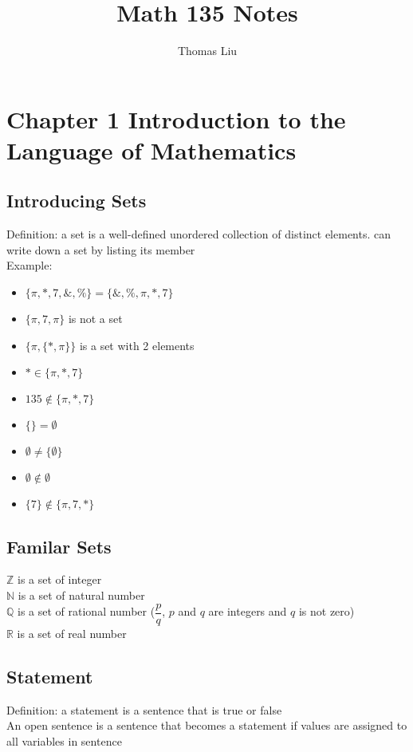\documentclass[12pt, letterpaper]{article}
\title{Math 135 Notes}
\author{Thomas Liu}
\begin{document}
\maketitle
\tableofcontents

\newpage

\section{Chapter 1 Introduction to the Language of Mathematics}
\subsection{Introducing Sets}
Definition: a set is a well-defined unordered collection of distinct elements. can write down a set by listing its member \\
Example:
\begin{itemize}
    \item $\{\pi, *, 7, \&, \%\} = \{\&, \%, \pi, *, 7\}$
    \item $\{\pi, 7, \pi\}$ is not a set 
    \item $\{\pi, \{*, \pi\}\}$ is a set with 2 elements
    \item $* \in \{\pi, *, 7\}$
    \item $135 \notin \{\pi, *, 7\}$
    \item $\{\} = \emptyset$
    \item $\emptyset \neq \{\emptyset\}$
    \item $\emptyset \notin \emptyset$
    \item $\{7\} \notin \{\pi, 7, *\}$
\end{itemize}
\subsection{Familar Sets}
$\mathbb{Z}$ is a set of integer \\
$\mathbb{N}$ is a set of natural number \\
$\mathbb{Q}$ is a set of rational number ($\dfrac{p}{q}$, $p$ and $q$ are integers and $q$ is not zero) \\
$\mathbb{R}$ is a set of real number
\subsection{Statement}
Definition: a statement is a sentence that is true or false \\
An open sentence is a sentence that becomes a statement if values are assigned to all variables in sentence
\end{document}
